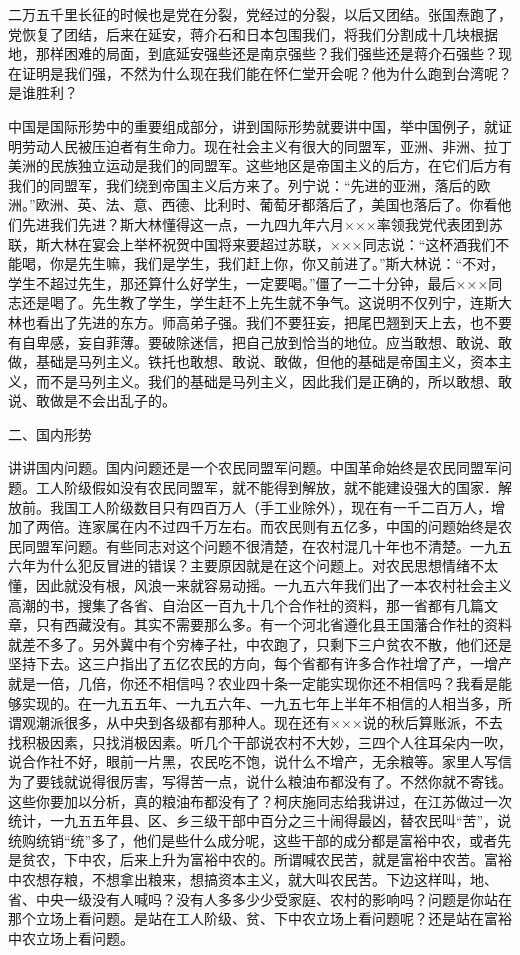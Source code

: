 二万五千里长征的时候也是党在分裂，党经过的分裂，以后又团结。张国焘跑了，党恢复了团结，后来在延安，蒋介石和日本包围我们，将我们分割成十几块根据地，那样困难的局面，到底延安强些还是南京强些？我们强些还是蒋介石强些？现在证明是我们强，不然为什么现在我们能在怀仁堂开会呢？他为什么跑到台湾呢？是谁胜利？

中国是国际形势中的重要组成部分，讲到国际形势就要讲中国，举中国例子，就证明劳动人民被压迫者有生命力。现在社会主义有很大的同盟军，亚洲、非洲、拉丁美洲的民族独立运动是我们的同盟军。这些地区是帝国主义的后方，在它们后方有我们的同盟军，我们绕到帝国主义后方来了。列宁说：“先进的亚洲，落后的欧洲。”欧洲、英、法、意、西德、比利时、葡萄牙都落后了，美国也落后了。你看他们先进我们先进？斯大林懂得这一点，一九四九年六月×××率领我党代表团到苏联，斯大林在宴会上举杯祝贺中国将来要超过苏联，×××同志说：“这杯酒我们不能喝，你是先生嘛，我们是学生，我们赶上你，你又前进了。”斯大林说：“不对，学生不超过先生，那还算什么好学生，一定要喝。”僵了一二十分钟，最后×××同志还是喝了。先生教了学生，学生赶不上先生就不争气。这说明不仅列宁，连斯大林也看出了先进的东方。师高弟子强。我们不要狂妄，把尾巴翘到天上去，也不要有自卑感，妄自菲薄。要破除迷信，把自己放到恰当的地位。应当敢想、敢说、敢做，基础是马列主义。铁托也敢想、敢说、敢做，但他的基础是帝国主义，资本主义，而不是马列主义。我们的基础是马列主义，因此我们是正确的，所以敢想、敢说、敢做是不会出乱子的。

二、国内形势

讲讲国内问题。国内问题还是一个农民同盟军问题。中国革命始终是农民同盟军问题。工人阶级假如没有农民同盟军，就不能得到解放，就不能建设强大的国家．解放前。我国工人阶级数目只有四百万人（手工业除外），现在有一千二百万人，增加了两倍。连家属在内不过四千万左右。而农民则有五亿多，中国的问题始终是农民同盟军问题。有些同志对这个问题不很清楚，在农村混几十年也不清楚。一九五六年为什么犯反冒进的错误？主要原因就是在这个问题上。对农民思想情绪不太懂，因此就没有根，风浪一来就容易动摇。一九五六年我们出了一本农村社会主义高潮的书，搜集了各省、自治区一百九十几个合作社的资料，那一省都有几篇文章，只有西藏没有。其实不需要那么多。有一个河北省遵化县王国藩合作社的资料就差不多了。另外冀中有个穷棒子社，中农跑了，只剩下三户贫农不散，他们还是坚持下去。这三户指出了五亿农民的方向，每个省都有许多合作社增了产，一增产就是一倍，几倍，你还不相信吗？农业四十条一定能实现你还不相信吗？我看是能够实现的。在一九五五年、一九五六年、一九五七年上半年不相信的人相当多，所谓观潮派很多，从中央到各级都有那种人。现在还有×××说的秋后算账派，不去找积极因素，只找消极因素。听几个干部说农村不大妙，三四个人往耳朵内一吹，说合作社不好，眼前一片黑，农民吃不饱，说什么不增产，无余粮等。家里人写信为了要钱就说得很厉害，写得苦一点，说什么粮油布都没有了。不然你就不寄钱。这些你要加以分析，真的粮油布都没有了？柯庆施同志给我讲过，在江苏做过一次统计，一九五五年县、区、乡三级干部中百分之三十闹得最凶，替农民叫“苦”，说统购统销“统”多了，他们是些什么成分呢，这些干部的成分都是富裕中农，或者先是贫农，下中农，后来上升为富裕中农的。所谓喊农民苦，就是富裕中农苦。富裕中农想存粮，不想拿出粮来，想搞资本主义，就大叫农民苦。下边这样叫，地、省、中央一级没有人喊吗？没有人多多少少受家庭、农村的影响吗？问题是你站在那个立场上看问题。是站在工人阶级、贫、下中农立场上看问题呢？还是站在富裕中农立场上看问题。

